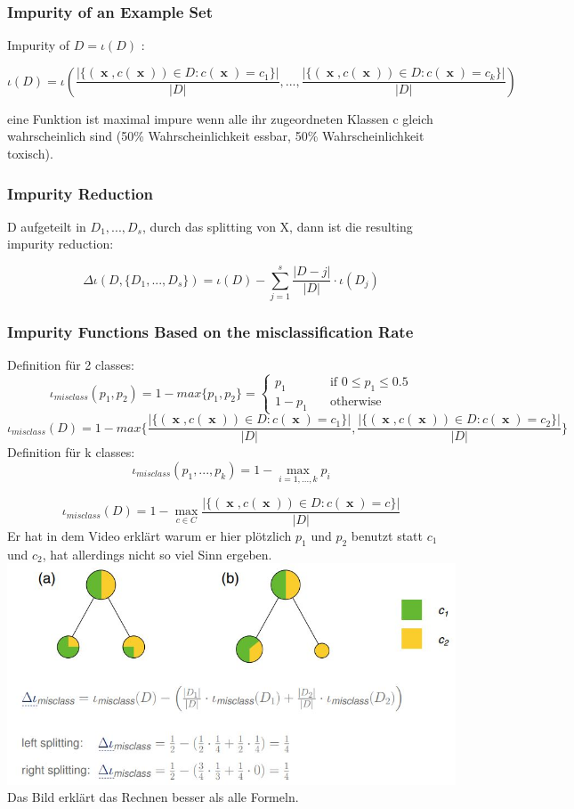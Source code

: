 \documentclass[11pt,a4paper]{article}
\DeclareMathOperator*{\x}{\textbf{x}}
\begin{document}
\begin{flushleft}
\subsubsection{Impurity of an Example Set}
Impurity of $D = \iota(D) $ :

$$ \iota (D) = \iota (\frac{|\{ (\x , c( \x ) ) \in D: c(\x ) = c_1 \}|}{|D|}, ... , \frac{|\{ (\x , c( \x ) ) \in D: c(\x ) = c_k \}|}{|D|} ) $$

eine Funktion ist maximal impure wenn alle ihr zugeordneten Klassen c gleich wahrscheinlich sind (50\% Wahrscheinlichkeit essbar, 50\% Wahrscheinlichkeit toxisch). 
\subsubsection{Impurity Reduction}
D aufgeteilt in $D_1, ..., D_s$, durch das splitting von X, dann ist die resulting impurity reduction: 

$$ \Delta \iota (D, \{D_1,..., D_s\}) = \iota (D) - \sum_{j=1}^s \frac{|D-j|}{|D|} \cdot \iota (D_j) $$

\subsubsection{Impurity Functions Based on the misclassification Rate}
Definition für 2 classes:
$$ \iota_{misclass} (p_1,p_2) = 1 - max \{p_1,p_2\} = 
\begin{cases}
p_1      & \quad \text{if } 0 \leq p_1 \leq 0.5 \\
1-p_1  & \quad \text{otherwise}
\end{cases} $$
$$ \iota_{misclass} (D) = 1 - max \{ \frac{|\{ (\x , c(\x )) \in D: c(\x ) = c_1 \}|}{|D|}, \frac{|\{ (\x , c(\x )) \in D: c(\x ) = c_2 \}|}{|D|}\} $$
Definition für k classes: 
$$ \iota_{misclass} (p_1, ... , p_k) = 1 - \max_{i = 1, ..., k} p_i $$

$$ \iota_{misclass} (D) = 1 - \max_{c \in C}  \frac{|\{ (\x , c(\x )) \in D: c(\x ) = c \}|}{|D|} $$
Er hat in dem Video erklärt warum er hier plötzlich $p_1$ und $p_2$ benutzt statt $c_1$ und $c_2$, hat allerdings nicht so viel Sinn ergeben. 
\includegraphics[width = \textwidth]{impurity}
Das Bild erklärt das Rechnen besser als alle Formeln.


\end{flushleft}
\end{document}
